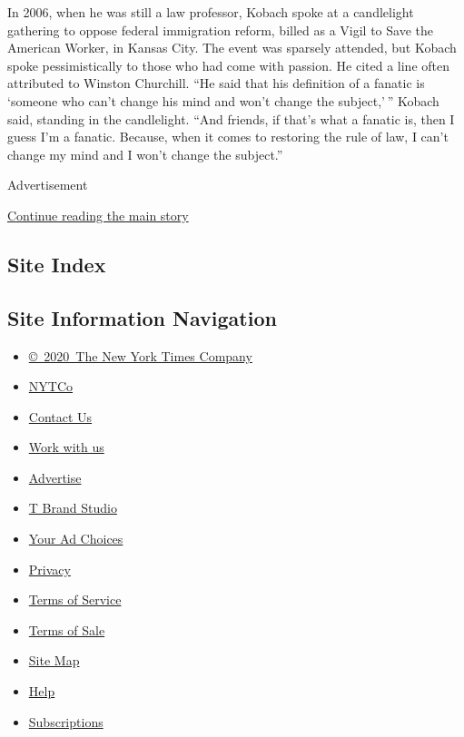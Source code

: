 In 2006, when he was still a law professor, Kobach spoke at a
candlelight gathering to oppose federal immigration reform, billed as a
Vigil to Save the American Worker, in Kansas City. The event was
sparsely attended, but Kobach spoke pessimistically to those who had
come with passion. He cited a line often attributed to Winston
Churchill. ``He said that his definition of a fanatic is `someone who
can't change his mind and won't change the subject,' '' Kobach said,
standing in the candlelight. ``And friends, if that's what a fanatic is,
then I guess I'm a fanatic. Because, when it comes to restoring the rule
of law, I can't change my mind and I won't change the subject.''

Advertisement

\protect\hyperlink{after-bottom}{Continue reading the main story}

\hypertarget{site-index}{%
\subsection{Site Index}\label{site-index}}

\hypertarget{site-information-navigation}{%
\subsection{Site Information
Navigation}\label{site-information-navigation}}

\begin{itemize}
\tightlist
\item
  \href{https://help.nytimes3xbfgragh.onion/hc/en-us/articles/115014792127-Copyright-notice}{©~2020~The
  New York Times Company}
\end{itemize}

\begin{itemize}
\tightlist
\item
  \href{https://www.nytco.com/}{NYTCo}
\item
  \href{https://help.nytimes3xbfgragh.onion/hc/en-us/articles/115015385887-Contact-Us}{Contact
  Us}
\item
  \href{https://www.nytco.com/careers/}{Work with us}
\item
  \href{https://nytmediakit.com/}{Advertise}
\item
  \href{http://www.tbrandstudio.com/}{T Brand Studio}
\item
  \href{https://www.nytimes3xbfgragh.onion/privacy/cookie-policy\#how-do-i-manage-trackers}{Your
  Ad Choices}
\item
  \href{https://www.nytimes3xbfgragh.onion/privacy}{Privacy}
\item
  \href{https://help.nytimes3xbfgragh.onion/hc/en-us/articles/115014893428-Terms-of-service}{Terms
  of Service}
\item
  \href{https://help.nytimes3xbfgragh.onion/hc/en-us/articles/115014893968-Terms-of-sale}{Terms
  of Sale}
\item
  \href{https://spiderbites.nytimes3xbfgragh.onion}{Site Map}
\item
  \href{https://help.nytimes3xbfgragh.onion/hc/en-us}{Help}
\item
  \href{https://www.nytimes3xbfgragh.onion/subscription?campaignId=37WXW}{Subscriptions}
\end{itemize}
